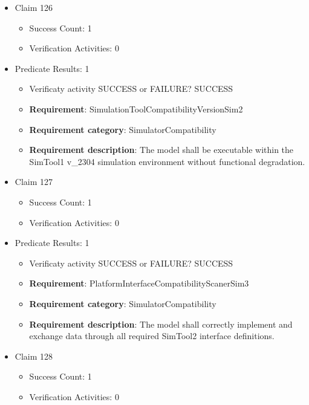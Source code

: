 \documentclass{article}
\begin{document}
\begin{itemize}
  				  \item Claim 126
				\begin{itemize}
			    	\item Success Count: 1 
			    	\item Verification Activities: 0
				\end{itemize}
				
									    
				\item Predicate Results: 1
					\begin{itemize}				
					\item Verificaty activity SUCCESS or FAILURE? SUCCESS
					
					\item \textbf{Requirement}: SimulationToolCompatibilityVersionSim2 
					\item \textbf{Requirement category}: SimulatorCompatibility
					\item \textbf{Requirement description}: The model shall be executable within the SimTool1 v_2304 simulation environment without functional degradation.
					\end{itemize}

  				  \item Claim 127
				\begin{itemize}
			    	\item Success Count: 1 
			    	\item Verification Activities: 0
				\end{itemize}
				
									    
				\item Predicate Results: 1
					\begin{itemize}				
					\item Verificaty activity SUCCESS or FAILURE? SUCCESS
					
					\item \textbf{Requirement}: PlatformInterfaceCompatibilityScanerSim3 
					\item \textbf{Requirement category}: SimulatorCompatibility
					\item \textbf{Requirement description}: The model shall correctly implement and exchange data through all required SimTool2 interface definitions.
					\end{itemize}

  				  \item Claim 128
				\begin{itemize}
			    	\item Success Count: 1 
			    	\item Verification Activities: 0
				\end{itemize}
				

\end{itemize}
\end{document}

